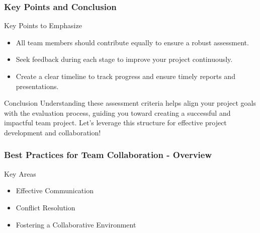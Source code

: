 \documentclass[aspectratio=169]{beamer}
\begin{document}
\begin{frame}[fragile]
    \frametitle{Key Points and Conclusion}
    \begin{block}{Key Points to Emphasize}
        \begin{itemize}
            \item All team members should contribute equally to ensure a robust assessment.
            \item Seek feedback during each stage to improve your project continuously.
            \item Create a clear timeline to track progress and ensure timely reports and presentations.
        \end{itemize}
    \end{block}
    \begin{block}{Conclusion}
        Understanding these assessment criteria helps align your project goals with the evaluation process, guiding you toward creating a successful and impactful team project. Let's leverage this structure for effective project development and collaboration!
    \end{block}
\end{frame}

\begin{frame}[fragile]
    \frametitle{Best Practices for Team Collaboration - Overview}
    \begin{block}{Key Areas}
        \begin{itemize}
            \item Effective Communication
            \item Conflict Resolution
            \item Fostering a Collaborative Environment
        \end{itemize}
    \end{block}
\end{frame}
\end{document}
